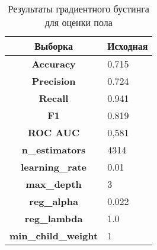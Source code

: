 \begin{table}[h!]
\centering
\begin{tabular}{|c|l|}
\hline
\textbf{Выборка}            & Исходная \\ \hline
\textbf{Accuracy}           & 0.715    \\ \hline
\textbf{Precision}          & 0.724    \\ \hline
\textbf{Recall}             & 0.941    \\ \hline
\textbf{F1}                 & 0.819    \\ \hline
\textbf{ROC AUC}            & 0,581    \\ \hline
\textbf{n\_estimators}      & 4314     \\ \hline
\textbf{learning\_rate}     & 0.01     \\ \hline
\textbf{max\_depth}         & 3        \\ \hline
\textbf{reg\_alpha}         & 0.022    \\ \hline
\textbf{reg\_lambda}        & 1.0      \\ \hline
\textbf{min\_child\_weight} & 1        \\ \hline
\end{tabular}
\caption{Результаты градиентного бустинга для оценки пола}
\label{table10}
\end{table}



\clearpage







